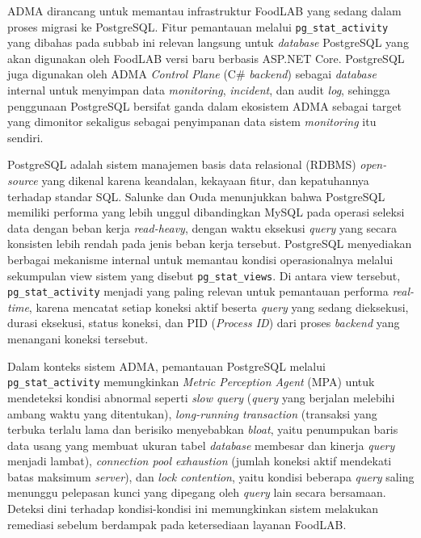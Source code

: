 ADMA dirancang untuk memantau infrastruktur FoodLAB yang sedang dalam proses migrasi ke PostgreSQL. Fitur pemantauan melalui \texttt{pg\_stat\_activity} yang dibahas pada subbab ini relevan langsung untuk \textit{database} PostgreSQL yang akan digunakan oleh FoodLAB versi baru berbasis ASP.NET Core. PostgreSQL juga digunakan oleh ADMA \textit{Control Plane} (C\# \textit{backend}) sebagai \textit{database} internal untuk menyimpan data \textit{monitoring}, \textit{incident}, dan audit \textit{log}, sehingga penggunaan PostgreSQL bersifat ganda dalam ekosistem ADMA sebagai target yang dimonitor sekaligus sebagai penyimpanan data sistem \textit{monitoring} itu sendiri.

PostgreSQL adalah sistem manajemen basis data relasional (RDBMS) \textit{open-source} yang dikenal karena keandalan, kekayaan fitur, dan kepatuhannya terhadap standar SQL. Salunke dan Ouda \cite{salunke2024performance} menunjukkan bahwa PostgreSQL memiliki performa yang lebih unggul dibandingkan MySQL pada operasi seleksi data dengan beban kerja \textit{read-heavy}, dengan waktu eksekusi \textit{query} yang secara konsisten lebih rendah pada jenis beban kerja tersebut. PostgreSQL menyediakan berbagai mekanisme internal untuk memantau kondisi operasionalnya melalui sekumpulan view sistem yang disebut \texttt{pg\_stat\_views}. Di antara view tersebut, \texttt{pg\_stat\_activity} menjadi yang paling relevan untuk pemantauan performa \textit{real-time}, karena mencatat setiap koneksi aktif beserta \textit{query} yang sedang dieksekusi, durasi eksekusi, status koneksi, dan PID (\textit{Process ID}) dari proses \textit{backend} yang menangani koneksi tersebut.

Dalam konteks sistem ADMA, pemantauan PostgreSQL melalui \texttt{pg\_stat\_activity} memungkinkan \textit{Metric Perception Agent} (MPA) untuk mendeteksi kondisi abnormal seperti \textit{slow query} (\textit{query} yang berjalan melebihi ambang waktu yang ditentukan), \textit{long-running transaction} (transaksi yang terbuka terlalu lama dan berisiko menyebabkan \textit{bloat}, yaitu penumpukan baris data usang yang membuat ukuran tabel \textit{database} membesar dan kinerja \textit{query} menjadi lambat), \textit{connection pool exhaustion} (jumlah koneksi aktif mendekati batas maksimum \textit{server}), dan \textit{lock contention}, yaitu kondisi beberapa \textit{query} saling menunggu pelepasan kunci yang dipegang oleh \textit{query} lain secara bersamaan. Deteksi dini terhadap kondisi-kondisi ini memungkinkan sistem melakukan remediasi sebelum berdampak pada ketersediaan layanan FoodLAB.


